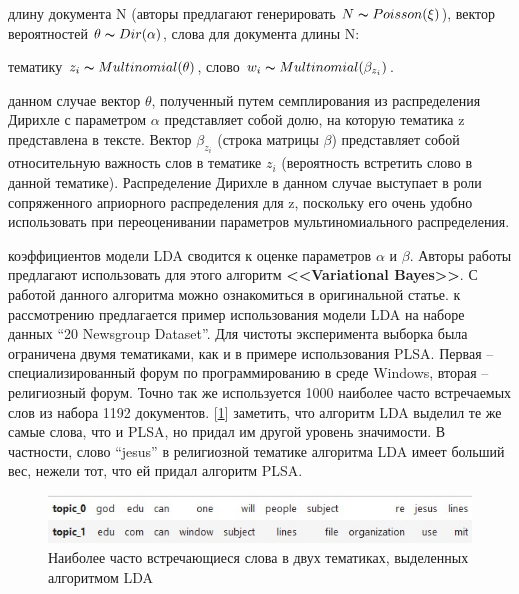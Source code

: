 \documentclass[aps,%
12pt,%
final,%
oneside,
onecolumn,%
musixtex, %
superscriptaddress,%
centertags]{article} %
\begin{document}
\begin{itemize}
     длину документа N (авторы предлагают генерировать $N \thicksim Poisson(\xi)$),
     вектор вероятностей $\theta \thicksim Dir(\alpha)$,
     слова для документа длины N:
    \begin{itemize}
         тематику $z_i  \thicksim Multinomial(\theta)$,
         слово $w_i  \thicksim Multinomial(\beta_{z_i})$.
    \end{itemize}
\end{itemize}
 данном случае вектор $\theta$, полученный путем семплирования из распределения Дирихле  с параметром $\alpha$ представляет собой долю, на которую тематика  z представлена в тексте. Вектор $\beta_{z_i}$  (строка матрицы $\beta$) представляет собой относительную важность слов в тематике $z_i$ (вероятность встретить слово в данной тематике).  Распределение Дирихле в данном случае выступает в роли сопряженного априорного распределения  для z, поскольку его очень удобно использовать при переоценивании параметров мультиномиального распределения.

 коэффициентов модели LDA сводится к оценке параметров $\alpha$ и $\beta$. Авторы работы предлагают использовать для этого алгоритм \textbf{<<Variational Bayes>>}. С работой данного алгоритма можно ознакомиться в оригинальной статье.
 к рассмотрению предлагается пример использования модели LDA на наборе данных “20 Newsgroup Dataset”. Для чистоты эксперимента выборка была ограничена двумя тематиками, как и в примере использования PLSA. Первая – специализированный форум по программированию в среде Windows, вторая – религиозный форум. Точно так же используется 1000 наиболее часто встречаемых слов из набора 1192 документов. [\ref{fig:lda_demo}]
 заметить, что алгоритм LDA выделил те же самые слова, что и PLSA, но придал им другой уровень значимости. В частности, слово “jesus” в религиозной тематике алгоритма LDA имеет больший вес, нежели тот, что ей придал алгоритм PLSA.

\begin{figure}[!h]
  \includegraphics[width=\linewidth]{LDA_demo.jpg}
  \caption{Наиболее часто встречающиеся слова в двух тематиках, выделенных алгоритмом LDA}
  \label{fig:lda_demo}
\end{figure}
\end{document}
